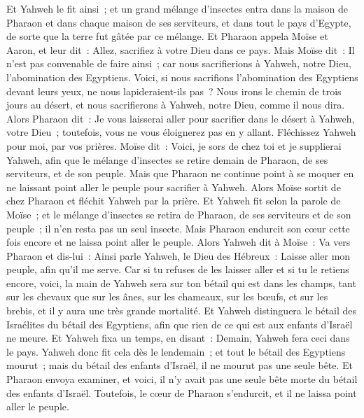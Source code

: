 \begin{multicols}{2}
Et Yahweh le fit ainsi~; et un grand mélange d'insectes entra dans la maison de Pharaon et dans chaque maison de ses serviteurs, et dans tout le pays d'Egypte, de sorte que la terre fut gâtée par ce mélange.
 Et Pharaon appela Moïse et Aaron, et leur dit~: Allez, sacrifiez à votre Dieu dans ce pays.
Mais Moïse dit~: Il n'est pas convenable de faire ainsi~; car nous sacrifierions à Yahweh, notre Dieu, l'abomination des Egyptiens. Voici, si nous sacrifions l'abomination des Egyptiens devant leurs yeux, ne nous lapideraient-ils pas~?
Nous irons le chemin de trois jours au désert, et nous sacrifierons à Yahweh, notre Dieu, comme il nous dira.
Alors Pharaon dit~: Je vous laisserai aller pour sacrifier dans le désert à Yahweh, votre Dieu~; toutefois, vous ne vous éloignerez pas en y allant. Fléchissez Yahweh pour moi, par vos prières.
Moïse dit~: Voici, je sors de chez toi et je supplierai Yahweh, afin que le mélange d'insectes se retire demain de Pharaon, de ses serviteurs, et de son peuple. Mais que Pharaon ne continue point à se moquer en ne laissant point aller le peuple pour sacrifier à Yahweh.
Alors Moïse sortit de chez Pharaon et fléchit Yahweh par la prière.
Et Yahweh fit selon la parole de Moïse~; et le mélange d'insectes se retira de Pharaon, de ses serviteurs et de son peuple~; il n'en resta pas un seul insecte.
Mais Pharaon endurcit son cœur cette fois encore et ne laissa point aller le peuple.
\VerseOne{}Alors Yahweh dit à Moïse~: Va vers Pharaon et dis-lui~: Ainsi parle Yahweh, le Dieu des Hébreux~: Laisse aller mon peuple, afin qu'il me serve.
Car si tu refuses de les laisser aller et si tu le retiens encore,
voici, la main de Yahweh sera sur ton bétail qui est dans les champs, tant sur les chevaux que sur les ânes, sur les chameaux, sur les bœufs, et sur les brebis, et il y aura une très grande mortalité.
Et Yahweh distinguera le bétail des Israélites du bétail des Egyptiens, afin que rien de ce qui est aux enfants d'Israël ne meure.
Et Yahweh fixa un temps, en disant~: Demain, Yahweh fera ceci dans le pays.
Yahweh donc fit cela dès le lendemain~; et tout le bétail des Egyptiens mourut~; mais du bétail des enfants d'Israël, il ne mourut pas une seule bête.
Et Pharaon envoya examiner, et voici, il n'y avait pas une seule bête morte du bétail des enfants d'Israël. Toutefois, le cœur de Pharaon s'endurcit, et il ne laissa point aller le peuple.

\end{multicols}
